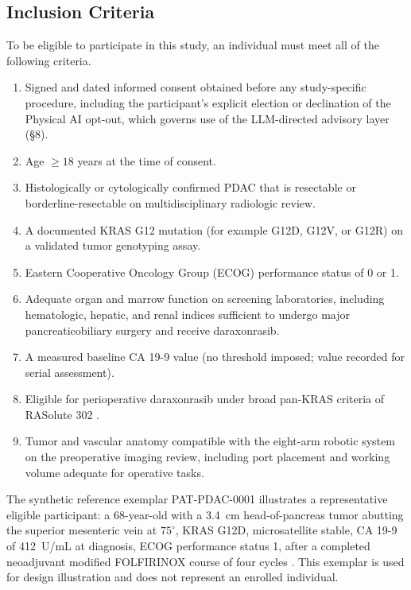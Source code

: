 \clearpage

\subsection{Inclusion Criteria}

To be eligible to participate in this study, an individual must meet all of the
following criteria.

\begin{enumerate}[leftmargin=1.6em,itemsep=2pt,topsep=2pt]
\item Signed and dated informed consent obtained before any study-specific
procedure, including the participant's explicit election or declination of the
Physical AI opt-out, which governs use of the LLM-directed advisory layer (\S8).
\item Age $\geq 18$ years at the time of consent.
\item Histologically or cytologically confirmed PDAC that is resectable or
borderline-resectable on multidisciplinary radiologic review.
\item A documented KRAS G12 mutation (for example G12D, G12V, or G12R) on a
validated tumor genotyping assay.
\item Eastern Cooperative Oncology Group (ECOG) performance status of 0 or 1.
\item Adequate organ and marrow function on screening laboratories, including
hematologic, hepatic, and renal indices sufficient to undergo major
pancreaticobiliary surgery and receive daraxonrasib.
\item A measured baseline CA 19-9 value (no threshold imposed; value recorded for serial assessment).
\item Eligible for perioperative daraxonrasib under broad pan-KRAS criteria of RASolute 302 \cite{rasolute302}.
\item Tumor and vascular anatomy compatible with the eight-arm robotic system on
the preoperative imaging review, including port placement and working volume
adequate for operative tasks.
\end{enumerate}

The synthetic reference exemplar PAT-PDAC-0001 illustrates a representative
eligible participant: a 68-year-old with a 3.4~cm head-of-pancreas tumor abutting
the superior mesenteric vein at $75^\circ$, KRAS G12D, microsatellite stable,
CA 19-9 of 412~U/mL at diagnosis, ECOG performance status 1, after a completed
neoadjuvant modified FOLFIRINOX course of four cycles \cite{Conroy2018}. This
exemplar is used for design illustration and does not represent an enrolled
individual.

